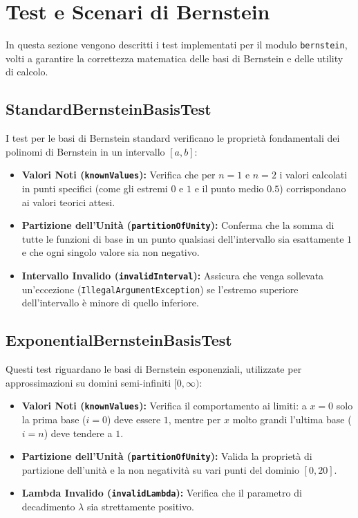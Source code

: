 \section{Test e Scenari di Bernstein}

In questa sezione vengono descritti i test implementati per il modulo \texttt{bernstein}, volti a garantire la correttezza matematica delle basi di Bernstein e delle utility di calcolo.

\subsection{StandardBernsteinBasisTest}
I test per le basi di Bernstein standard verificano le proprietà fondamentali dei polinomi di Bernstein in un intervallo $[a, b]$:
\begin{itemize}
    \item \textbf{Valori Noti (\texttt{knownValues}):} Verifica che per $n=1$ e $n=2$ i valori calcolati in punti specifici (come gli estremi $0$ e $1$ e il punto medio $0.5$) corrispondano ai valori teorici attesi.
    \item \textbf{Partizione dell'Unità (\texttt{partitionOfUnity}):} Conferma che la somma di tutte le funzioni di base in un punto qualsiasi dell'intervallo sia esattamente $1$ e che ogni singolo valore sia non negativo.
    \item \textbf{Intervallo Invalido (\texttt{invalidInterval}):} Assicura che venga sollevata un'eccezione (\texttt{IllegalArgumentException}) se l'estremo superiore dell'intervallo è minore di quello inferiore.
\end{itemize}

\subsection{ExponentialBernsteinBasisTest}
Questi test riguardano le basi di Bernstein esponenziali, utilizzate per approssimazioni su domini semi-infiniti $[0, \infty)$:
\begin{itemize}
    \item \textbf{Valori Noti (\texttt{knownValues}):} Verifica il comportamento ai limiti: a $x=0$ solo la prima base ($i=0$) deve essere $1$, mentre per $x$ molto grandi l'ultima base ($i=n$) deve tendere a $1$.
    \item \textbf{Partizione dell'Unità (\texttt{partitionOfUnity}):} Valida la proprietà di partizione dell'unità e la non negatività su vari punti del dominio $[0, 20]$.
    \item \textbf{Lambda Invalido (\texttt{invalidLambda}):} Verifica che il parametro di decadimento $\lambda$ sia strettamente positivo.
\end{itemize}

